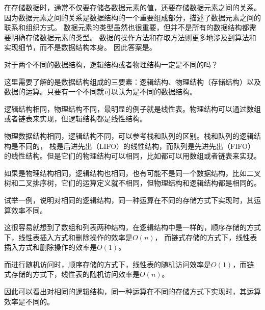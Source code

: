 \documentclass[b5paper,11pt]{article}
\begin{document}
\begin{solution}
  在存储数据时，通常不仅要存储各数据元素的值，还要存储数据元素之间的关系。
  因为数据元素之间的关系是数据结构的一个重要组成部分，描述了数据元素之间的联系和组织方式。
  数据元素的类型虽然也很重要，但并不是所有的数据结构都需要明确存储数据元素的类型。
  数据的操作方法和存取方法则更多地涉及到算法和实现细节，而不是数据结构本身。
  因此答案是。
\end{solution}

\vspace{10pt} %

\begin{question}
  对于两个不同的数据结构，逻辑结构或者物理结构一定是不同的吗？
\end{question}

\begin{cquote}
  这里需要了解的是数据结构组成的三要素：逻辑结构、物理结构（存储结构）以及数据的运算。只要有一个不同就可以认为是不同的数据结构。

  逻辑结构相同，物理结构不同，最明显的例子就是线性表。物理结构可以通过数组或者链表来实现，但逻辑结构都是线性结构。

  物理数据结构相同，逻辑结构不同，可以参考栈和队列的区别。栈和队列的逻辑结构是不同的，
  栈是后进先出（LIFO）的线性结构，而队列是先进先出（FIFO）的线性结构。但是它们的物理结构可以相同，比如都可以用数组或者链表来实现。

  如果是物理结构相同，逻辑结构也相同，也有可能不是同一个数据结构，比如二叉树和二叉排序树，它们的运算定义就不相同，但物理结构和逻辑结构都是相同的。
\end{cquote}

\vspace{10pt} %

\begin{question}
  试举一例，说明对相同的逻辑结构，同一种运算在不同的存储方式下实现时，其运算效率不同。
\end{question}
\begin{cquote}
  这很容易就想到了数组和列表两种结构，在逻辑结构中是一样的，顺序存储的方式下，线性表插入方式和删除操作的效率是$O(n)$，
  而链式存储的方式下，线性表插入方式和删除操作的效率是$O(1)$。

  而进行随机访问时，顺序存储的方式下，线性表的随机访问效率是$O(1)$，而链式存储的方式下，线性表的随机访问效率是$O(n)$。

  因此可以看出对相同的逻辑结构，同一种运算在不同的存储方式下实现时，其运算效率是不同的。
\end{cquote}
\end{document}

